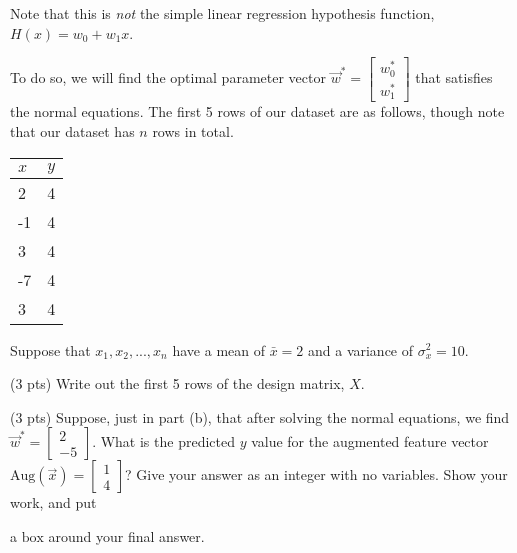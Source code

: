 \documentclass[twoside,12pt]{article}
\begin{document}
\begin{probset}
\begin{prob}[(19 pts)]
Note that this is \textit{not} the simple linear regression hypothesis function, $H(x) = w_0 + w_1x$.

To do so, we will find the optimal parameter vector $\vec{w}^* = \begin{bmatrix} w_0^* \\ w_1^* \end{bmatrix}$ that satisfies the normal equations. The first 5 rows of our dataset are as follows, though note that our dataset has $n$ rows in total.

\begin{table}[H]
\centering
\begin{tabular}{|l|l|}
\hline
$x$ & $y$ \\ \hline
2   & 4   \\ \hline
-1  & 4   \\ \hline
3   & 4  \\ \hline
-7  & 4   \\ \hline
3   & 4   \\ \hline
\end{tabular}
\end{table}

Suppose that $x_1, x_2, ..., x_n$ have a mean of $\bar{x} = 2$ and a variance of $\sigma_x^2 = 10$.

\begin{subprobset}

\begin{subprob}(3 pts) Write out the first 5 rows of the design matrix, $X$.

\begin{responsebox}{1.5in}
    
\end{responsebox}

\end{subprob}

\begin{subprob}(3 pts) Suppose, just in part (b), that after solving the normal equations, we find $\vec{w}^* = \begin{bmatrix} 2 \\ -5 \end{bmatrix}$. What is the predicted $y$ value for the augmented feature vector $\text{Aug}(\vec{x}) =  \begin{bmatrix} 1 \\ 4 \end{bmatrix}$? Give your answer as an integer with no variables. Show your work, and put 

a $\boxed{\text{box}}$ around your final answer.


\end{subprob}
\end{subprobset}
\end{prob}
\end{probset}
\end{document}
